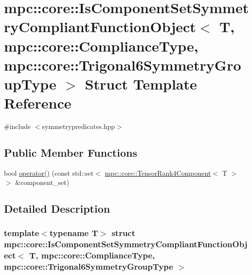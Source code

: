 \hypertarget{structmpc_1_1core_1_1_is_component_set_symmetry_compliant_function_object_3_01_t_00_01mpc_1_1cor7e9d925cc161002e187fa51051b32e07}{}\section{mpc\+:\+:core\+:\+:Is\+Component\+Set\+Symmetry\+Compliant\+Function\+Object$<$ T, mpc\+:\+:core\+:\+:Compliance\+Type, mpc\+:\+:core\+:\+:Trigonal6\+Symmetry\+Group\+Type $>$ Struct Template Reference}
\label{structmpc_1_1core_1_1_is_component_set_symmetry_compliant_function_object_3_01_t_00_01mpc_1_1cor7e9d925cc161002e187fa51051b32e07}


{\ttfamily \#include $<$symmetrypredicates.\+hpp$>$}

\subsection*{Public Member Functions}
\begin{DoxyCompactItemize}
\item 
bool \mbox{\hyperlink{structmpc_1_1core_1_1_is_component_set_symmetry_compliant_function_object_3_01_t_00_01mpc_1_1cor7e9d925cc161002e187fa51051b32e07_a903bd64b4620a6843a873024b35d26f1}{operator()}} (const std\+::set$<$ \mbox{\hyperlink{namespacempc_1_1core_ac3a232afc7c680d580628e834030482f}{mpc\+::core\+::\+Tensor\+Rank4\+Component}}$<$ T $>$ $>$ \&component\+\_\+set)
\end{DoxyCompactItemize}


\subsection{Detailed Description}
\subsubsection*{template$<$typename T$>$\newline
struct mpc\+::core\+::\+Is\+Component\+Set\+Symmetry\+Compliant\+Function\+Object$<$ T, mpc\+::core\+::\+Compliance\+Type, mpc\+::core\+::\+Trigonal6\+Symmetry\+Group\+Type $>$}



